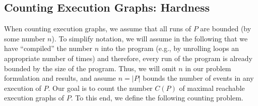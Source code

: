 \documentclass[acmsmall]{acmart}
\newcommand{\lab}{\mathsf{lab}}
\newcommand{\tid}{\mathsf{tid}}
\newcommand{\floc}{\mathsf{loc}}
\newcommand{\scg}{\mathsf{SCG}}
\newcommand{\mo}[1]{{\textcolor{orange}{\mathsf{mo}}_{#1}}}
\begin{document}

\subsection{Counting Execution Graphs: Hardness}

When counting execution graphs, we assume that all runs of $P$ are bounded (by some number $n$).
To simplify notation, we will assume in the following that we have ``compiled'' the number $n$ 
into the program (e.g., by unrolling loops an appropriate number of times) and 
therefore, every run of the program is already bounded by the size of the program. 
Thus, we will omit $n$ in our problem formulation and results, and assume $n = |P|$ 
bounds the number of events in any execution of $P$.
%
Our goal is to count the number $C(P)$ of maximal reachable execution graphs of $P$.
To this end, we define the following counting problem.
\end{document}
